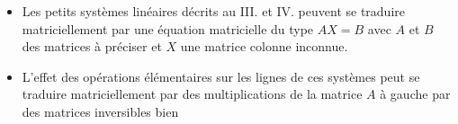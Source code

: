 \begin{rem}
	\begin{itemize}
		\item Les petits systèmes linéaires décrits au III. et IV. peuvent se traduire matriciellement par une équation matricielle du type \(AX = B\) avec \(A\) et \(B\) des matrices à préciser et \(X\) une matrice colonne inconnue.
		\item L’effet des opérations élémentaires sur les lignes de ces systèmes peut se traduire matriciellement par des multiplications de la matrice \(A\) à gauche par des matrices inversibles bien
	\end{itemize}
\end{rem}



